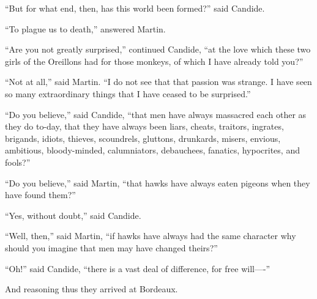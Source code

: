 ``But for what end, then, has this world been formed?'' said Candide.

``To plague us to death,'' answered Martin.

``Are you not greatly surprised,'' continued Candide, ``at the love which these two girls of the Oreillons had for those monkeys, of which I have already told you?''

``Not at all,'' said Martin. ``I do not see that that passion was strange. I have seen so many extraordinary things that I have ceased to be surprised.''

``Do you believe,'' said Candide, ``that men have always massacred each other as they do to-day, that they have always been liars, cheats, traitors, ingrates, brigands, idiots, thieves, scoundrels, gluttons, drunkards, misers, envious, ambitious, bloody-minded, calumniators, debauchees, fanatics, hypocrites, and fools?''

``Do you believe,'' said Martin, ``that hawks have always eaten pigeons when they have found them?''

``Yes, without doubt,'' said Candide.

``Well, then,'' said Martin, ``if hawks have always had the same character why should you imagine that men may have changed theirs?''

``Oh!'' said Candide, ``there is a vast deal of difference, for free will----''

And reasoning thus they arrived at Bordeaux.

